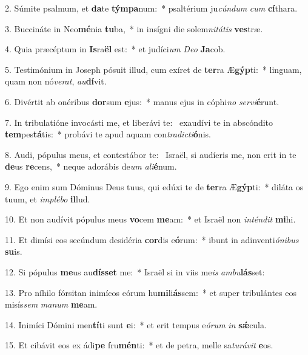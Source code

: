 2. Súmite psalmum, et \textbf{da}te \textbf{tým}\textbf{pa}num:~*  psaltérium ju\textit{cún}\textit{dum} \textit{cum} \textbf{cí}thara.\

3. Buccináte in Neo\textbf{mé}nia \textbf{tu}ba,~*  in insígni die solem\textit{ni}\textit{tá}\textit{tis} \textbf{ves}træ.\

4. Quia præcéptum in \textbf{Is}ra\textbf{ël} est:~*  et judíci\textit{um} \textit{De}\textit{o} \textbf{Ja}cob.\

5. Testimónium in Joseph pósuit illud, cum exíret de \textbf{ter}ra Æ\textbf{gýp}ti:~*  linguam, quam non nó\textit{ve}\textit{rat}, \textit{au}\textbf{dí}vit.\

6. Divértit ab onéribus \textbf{dor}sum \textbf{e}jus:~*  manus ejus in cóphi\textit{no} \textit{ser}\textit{vi}\textbf{é}runt.\

7. In tribulatióne invocásti me, et liberávi te: \dag\  exaudívi te in abscóndito \textbf{tem}pes\textbf{tá}tis:~*  probávi te apud aquam con\textit{tra}\textit{dic}\textit{ti}\textbf{ó}nis.\

8. Audi, pópulus meus, et contestábor te: \dag\  Israël, si audíeris me, non erit in te \textbf{de}us \textbf{re}cens,~*  neque adorábis de\textit{um} \textit{a}\textit{li}\textbf{é}num.\

9. Ego enim sum Dóminus Deus tuus, qui edúxi te de \textbf{ter}ra Æ\textbf{gýp}ti:~*  diláta os tuum, et \textit{im}\textit{plé}\textit{bo} \textbf{il}lud.\

10. Et non audívit pópulus meus \textbf{vo}cem \textbf{me}am:~*  et Israël non \textit{in}\textit{tén}\textit{dit} \textbf{mi}hi.\

11. Et dimísi eos secúndum desidéria \textbf{cor}dis e\textbf{ó}rum:~*  ibunt in adinventi\textit{ó}\textit{ni}\textit{bus} \textbf{su}is.\

12. Si pópulus \textbf{me}us au\textbf{dís}\textbf{set} me:~*  Israël si in viis me\textit{is} \textit{am}\textit{bu}\textbf{lás}set:\

13. Pro níhilo fórsitan inimícos eórum hu\textbf{mi}li\textbf{ás}sem:~*  et super tribulántes eos misís\textit{sem} \textit{ma}\textit{num} \textbf{me}am.\

14. Inimíci Dómini men\textbf{tí}ti sunt \textbf{e}i:~*  et erit tempus e\textit{ó}\textit{rum} \textit{in} \textbf{sǽ}cula.\

15. Et cibávit eos ex ádi\textbf{pe} fru\textbf{mén}ti:~*  et de petra, melle sa\textit{tu}\textit{rá}\textit{vit} \textbf{e}os.\

